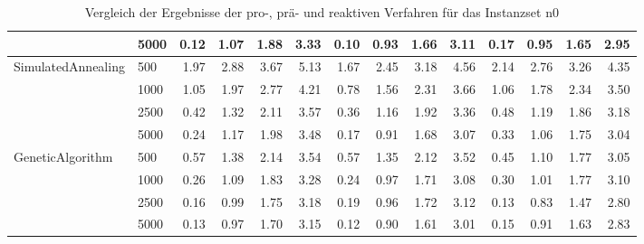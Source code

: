 \begin{table}[H]
{\begin{tabular}{ll|rrrr|rrrr|rrrr}
                 & 5000 &           0.12 & 1.07 & 1.88 & 3.33 &            0.10 & 0.93 & 1.66 & 3.11 &          0.17 & 0.95 & 1.65 & 2.95 \\ \hline
SimulatedAnnealing & 500  &           1.97 & 2.88 & 3.67 & 5.13 &            1.67 & 2.45 & 3.18 & 4.56 &          2.14 & 2.76 & 3.26 & 4.35 \\
                 & 1000 &           1.05 & 1.97 & 2.77 & 4.21 &            0.78 & 1.56 & 2.31 & 3.66 &          1.06 & 1.78 & 2.34 & 3.50 \\
                 & 2500 &           0.42 & 1.32 & 2.11 & 3.57 &            0.36 & 1.16 & 1.92 & 3.36 &          0.48 & 1.19 & 1.86 & 3.18 \\
                 & 5000 &           0.24 & 1.17 & 1.98 & 3.48 &            0.17 & 0.91 & 1.68 & 3.07 &          0.33 & 1.06 & 1.75 & 3.04 \\ \hline
GeneticAlgorithm & 500  &           0.57 & 1.38 & 2.14 & 3.54 &            0.57 & 1.35 & 2.12 & 3.52 &          0.45 & 1.10 & 1.77 & 3.05 \\
                 & 1000 &           0.26 & 1.09 & 1.83 & 3.28 &            0.24 & 0.97 & 1.71 & 3.08 &          0.30 & 1.01 & 1.77 & 3.10 \\
                 & 2500 &           0.16 & 0.99 & 1.75 & 3.18 &            0.19 & 0.96 & 1.72 & 3.12 &          0.13 & 0.83 & 1.47 & 2.80 \\
                 & 5000 &           0.13 & 0.97 & 1.70 & 3.15 &            0.12 & 0.90 & 1.61 & 3.01 &          0.15 & 0.91 & 1.63 & 2.83 \\
\bottomrule
\end{tabular}
}
\caption{Vergleich der Ergebnisse der pro-, prä- und reaktiven Verfahren für das Instanzset n0}
\label{tab:comparision_n0}
\end{table}

